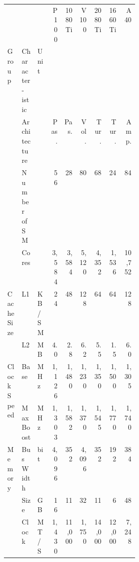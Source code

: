 \begin{tabular}{p{0.11\linewidth}p{0.12\linewidth}p{0.082\linewidth}|rrrrrr}
    \toprule
                                                  &                          &                      & P100  & 1080Ti & V100   & 2080Ti & 1660Ti & A40    \\
    Group                                         & Character-\newline istic & Unit                 &       &        &        &        &        &        \\
    \midrule\midrule
    \multirow[t]{3}{\linewidth}{}                 & Architecture             &                      & Pas.  & Pas.   & Vol.   & Tur.   & Tur.   & Amp.   \\
    \cline{2-9}
                                                  & Number of SM             &                      & 56    & 28     & 80     & 68     & 24     & 84     \\
    \cline{2-9}
                                                  & Cores                    &                      & 3,584 & 3,584  & 5,120  & 4,352  & 1,536  & 10,752 \\
    \cline{1-9} \cline{2-9}
    \multirow[t]{2}{\linewidth}{Cache Size}       & L1                       & KB/SM                & 24    & 48     & 128    & 64     & 64     & 128    \\
    \cline{2-9}
                                                  & L2                       & MB                   & 4.0   & 2.8    & 6.2    & 5.5    & 1.5    & 6.0    \\
    \cline{1-9} \cline{2-9}
    \multirow[t]{2}{\linewidth}{Clock Speed}      & Base                     & MHz                  & 1,126 & 1,480  & 1,230  & 1,350  & 1,500  & 1,305  \\
    \cline{2-9}
                                                  & Max Boost                & MHz                  & 1,303 & 1,582  & 1,370  & 1,545  & 1,770  & 1,740  \\
    \cline{1-9} \cline{2-9}
    \multirow[t]{4}{\linewidth}{Memory}           & Bus Width                & bit                  & 4,096 & 352    & 4,096  & 352    & 192    & 384    \\
    \cline{2-9}
                                                  & Size                     & GB                   & 16    & 11     & 32     & 11     & 6      & 48     \\
    \cline{2-9}
                                                  & Clock                    & MT/S                 & 1,430 & 11,000 & 1,750  & 14,000 & 12,000 & 7,248  \\

\end{tabular}
